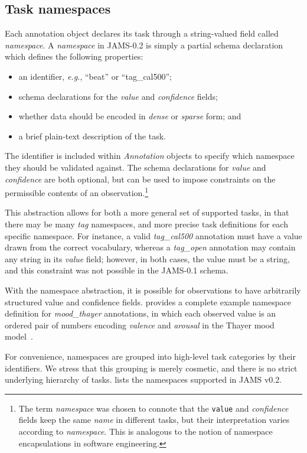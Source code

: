 \documentclass{article}
\begin{document}
\subsection{Task namespaces}\label{sec:schema:namespace}
Each annotation object declares its task through a string-valued field called \emph{namespace}.
A \emph{namespace} in JAMS-0.2 is simply a partial schema declaration which defines the following properties:
\begin{itemize}
    \setlength\itemsep{0em}
    \item an identifier, \emph{e.g.}, ``beat'' or ``tag\_cal500'';
    \item schema declarations for the \emph{value} and \emph{confidence} fields;
    \item whether data should be encoded in \emph{dense} or \emph{sparse} form; and
    \item a brief plain-text description of the task.
\end{itemize}
The identifier is included within \emph{Annotation} objects to specify which namespace they should be validated against.
The schema declarations for \emph{value} and \emph{confidence} are both optional, but can be used to impose constraints on the permissible
contents of an observation.\footnote{The term \emph{namespace} was chosen to connote that
the \texttt{value} and \emph{confidence} fields keep the same \emph{name} in different
tasks, but their interpretation varies according to \emph{namespace}.  This is analogous
to the notion of namespace encapsulations in software engineering.}

This abstraction allows for both a more general set of supported tasks, in that there may be many \emph{tag} namespaces, 
and more precise task definitions for each specific namespace.
For instance, a valid \emph{tag\_cal500} annotation must have a value drawn from the correct vocabulary, whereas a \emph{tag\_open}
annotation may contain any string in its \emph{value} field; however, in both cases, the value must be a string, and this constraint was
not possible in the JAMS-0.1 schema.

With the namespace abstraction, it is possible for observations to have arbitrarily structured value and confidence fields.
 provides a complete example namespace definition for \emph{mood\_thayer} annotations, in which each observed value is an ordered pair of numbers encoding \emph{valence}
and \emph{arousal} in the Thayer mood model~\cite{thayer}.

For convenience, namespaces are grouped into high-level task categories by their identifiers.
We stress that this grouping is merely cosmetic, and there is no strict underlying hierarchy of tasks.
 lists the namespaces supported in JAMS v0.2.
\end{document}
